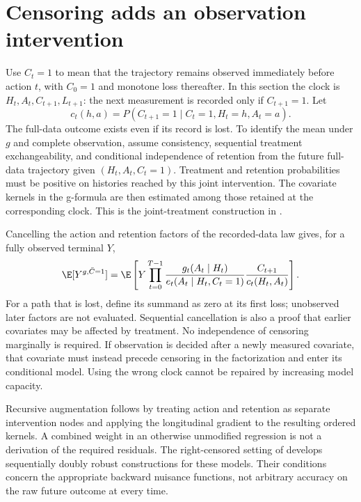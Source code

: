 \section{Censoring adds an observation intervention}
\label{r3:censoring}
Use $C_t=1$ to mean that the trajectory remains observed immediately
before action $t$, with $C_0=1$ and monotone loss thereafter. In this
section the clock is $H_t,A_t,C_{t+1},L_{t+1}$: the next measurement
is recorded only if $C_{t+1}=1$. Let
\[
 c_t(h,a)=P(C_{t+1}=1\mid C_t=1,H_t=h,A_t=a).
\]
The full-data outcome exists even if its record is lost. To identify
the mean under $g$ and complete observation, assume consistency,
sequential treatment exchangeability, and conditional independence of
retention from the future full-data trajectory given $(H_t,A_t,C_t=1)$.
Treatment and retention probabilities must be positive on histories
reached by this joint intervention. The covariate kernels in the
g-formula are then estimated among those retained at the corresponding
clock. This is the joint-treatment construction in
\citet[Section 21.5, printed pp.275--276]{hernan2020}.

Cancelling the action and retention factors of the recorded-data law
gives, for a fully observed terminal $Y$,
\begin{equation}
 \E[Y^{g,\bar C=1}]
 =\E\left[Y\prod_{t=0}^{T-1}
       \frac{g_t(A_t\mid H_t)}{e_t(A_t\mid H_t,C_t=1)}
       \frac{C_{t+1}}{c_t(H_t,A_t)}\right].
 \label{r3:censor-weights}
\end{equation}
For a path that is lost, define its summand as zero at its first loss;
unobserved later factors are not evaluated. Sequential cancellation is
also a proof that earlier covariates may be affected by treatment.
No independence of censoring marginally is required. If observation
is decided after a newly measured covariate, that covariate must instead
precede censoring in the factorization and enter its conditional model.
Using the wrong clock cannot be repaired by increasing model capacity.

Recursive augmentation follows by treating action and retention as
separate intervention nodes and applying the longitudinal gradient
to the resulting ordered kernels. A combined weight in an otherwise
unmodified regression is not a derivation of the required residuals.
The right-censored setting of \citet{sequentialdr2018} develops
sequentially doubly robust constructions for these models. Their
conditions concern the appropriate backward nuisance functions, not
arbitrary accuracy on the raw future outcome at every time.

